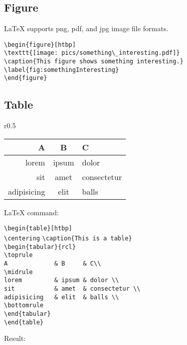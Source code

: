 \documentclass{article}
\begin{document}
\subsection{Figure}

\LaTeX{} supports png, pdf, and jpg image file formats.
\vspace{3mm}

\noindent\verb|\begin{figure}[htbp]|\\
\verb|\texttt{[image: pics/something\_interesting.pdf]}|\\
\verb|\caption{This figure shows something interesting.}|\\
\verb|\label{fig:somethingInteresting}|\\
\verb|\end{figure}|

\newpage
\subsection{Table}

\begin{wraptable}[0]{r}{0.5\textwidth}
\centering
\caption{This is a table}
\begin{tabular}{rcl}
\toprule
A             & B     & C \\
\midrule
lorem         & ipsum & dolor \\
sit           & amet  & consectetur \\
adipisicing   & elit  & balls \\
\bottomrule
\end{tabular}
\end{wraptable}
\begin{minipage}[t]{0.55\textwidth}
{\LaTeX} command:
\vspace{3mm}

\verb|\begin{table}[htbp]|\\
\verb|\centering|
\verb|\caption{This is a table}|\\
\verb|\begin{tabular}{rcl}|\\
\verb|\toprule|\\
\verb|A             & B     & C\\|\\
\verb|\midrule|\\
\verb|lorem         & ipsum & dolor \\|\\
\verb|sit           & amet  & consectetur \\|\\
\verb|adipisicing   & elit  & balls \\|\\
\verb|\bottomrule|\\
\verb|\end{tabular}|\\
\verb|\end{table}|\\
\end{minipage}
\begin{minipage}[t]{0.45\textwidth}
Result:
\end{minipage}
\end{document}
